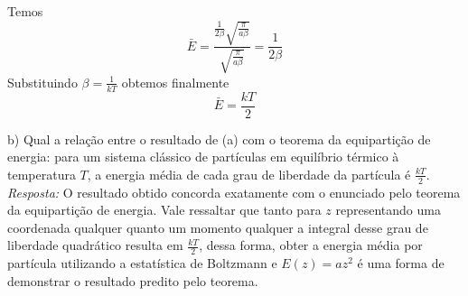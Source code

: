 \documentclass[11pt,leqno]{article}
\begin{document}
Temos
\begin{equation}
\bar{E}=\frac{ \frac{1}{2\beta} \sqrt{\frac{\pi}{a \beta}} }{ \sqrt{\frac{\pi}{a \beta}} }=\frac{1}{2\beta}
\nonumber
\end{equation}
Substituindo $\beta=\frac{1}{kT}$ obtemos finalmente
\begin{equation}
\bar{E}=\frac{kT}{2}
\nonumber
\end{equation}

\noindent
b) Qual a relação entre o resultado de (a) com o teorema da equipartição de energia: para um sistema clássico de partículas em equilíbrio térmico à temperatura $T$, a energia média de cada grau de liberdade da partícula é $\frac{kT}{2}$.\\
{\it Resposta:} O resultado obtido concorda exatamente com o enunciado pelo teorema da equipartição de energia. Vale ressaltar que tanto para $z$ representando uma coordenada qualquer quanto um momento qualquer a integral desse grau de liberdade quadrático resulta em $\frac{kT}{2}$, dessa forma, obter a energia média por partícula utilizando a estatística de Boltzmann e $E(z)=az^{2}$ é uma forma de demonstrar o resultado predito pelo teorema.\\
\end{document}
